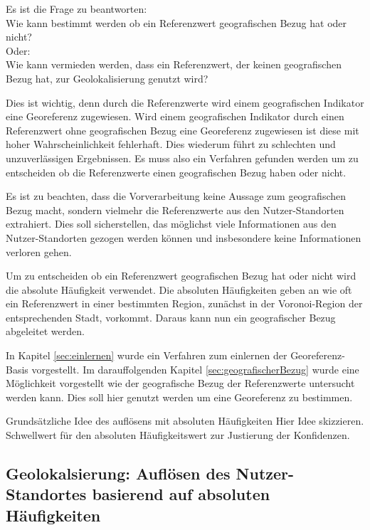 		Es ist die Frage zu beantworten: \\ Wie kann bestimmt werden ob ein Referenzwert geografischen Bezug hat oder nicht? \\
		Oder: \\ Wie kann vermieden werden, dass ein Referenzwert, der keinen geografischen Bezug hat, zur Geolokalisierung genutzt wird?
		
		Dies ist wichtig, denn durch die Referenzwerte wird einem geografischen Indikator eine Georeferenz zugewiesen. 
		Wird einem geografischen Indikator durch einen Referenzwert ohne geografischen Bezug eine Georeferenz zugewiesen ist diese mit hoher Wahrscheinlichkeit fehlerhaft.
		Dies wiederum führt zu schlechten und unzuverlässigen Ergebnissen.
		Es muss also ein Verfahren gefunden werden um zu entscheiden ob die Referenzwerte einen geografischen Bezug haben oder nicht.

		Es ist zu beachten, dass die Vorverarbeitung keine Aussage zum geografischen Bezug macht, sondern vielmehr die Referenzwerte aus den Nutzer-Standorten extrahiert. 
		Dies soll sicherstellen, das möglichst viele Informationen aus den Nutzer-Standorten gezogen werden können und insbesondere keine Informationen verloren gehen.  
		
		Um zu entscheiden ob ein Referenzwert geografischen Bezug hat oder nicht wird die absolute Häufigkeit verwendet.
		Die absoluten Häufigkeiten geben an wie oft ein Referenzwert in einer bestimmten Region, zunächst in der Voronoi-Region der entsprechenden Stadt, vorkommt.			 
		Daraus kann nun ein geografischer Bezug abgeleitet werden.

		In Kapitel \ref{sec:einlernen} wurde ein Verfahren zum einlernen der Georeferenz-Basis vorgestellt. 
		Im darauffolgenden Kapitel \ref{sec:geografischerBezug} wurde eine Möglichkeit vorgestellt wie der geografische Bezug der Referenzwerte untersucht werden kann.
		Dies soll hier genutzt werden um eine Georeferenz zu bestimmen. 

		

		Grundsätzliche Idee des auflösens mit absoluten Häufigkeiten
		Hier Idee skizzieren. 
		Schwellwert für den absoluten Häufigkeitswert zur Justierung der Konfidenzen.

		\subsection{Geolokalsierung: Auflösen des Nutzer-Standortes basierend auf absoluten Häufigkeiten} 

